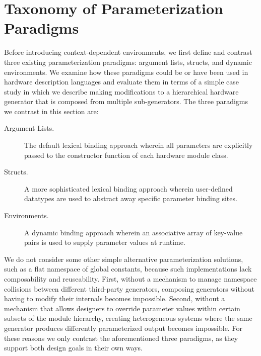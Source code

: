 \section{Taxonomy of Parameterization Paradigms}
\label{sec:tax}

Before introducing context-dependent environments, we first define and contrast three existing parameterization paradigms: argument lists, structs, and dynamic environments.
We examine how these paradigms could be or have been used in hardware description languages and evaluate them in terms of a simple case study
in which we describe making modifications to a hierarchical hardware generator that is composed from multiple sub-generators.
The three paradigms we contrast in this section are:

\begin{description}
\item[Argument Lists.] The default lexical binding approach wherein all parameters are explicitly passed to the constructor function of each hardware module class.
\item[Structs.] A more sophisticated lexical binding approach wherein user-defined datatypes are used to abstract away specific parameter binding sites.
\item[Environments.] A dynamic binding approach wherein an associative array of key-value pairs is used to supply parameter values at runtime.
\end{description}

We do not consider some other simple alternative parameterization solutions, such as a flat namespace of global constants, because such implementations lack composability and reuseability.
First, without a mechanism to manage namespace collisions between different third-party generators, composing generators without having to modify their internals becomes impossible.
Second, without a mechanism that allows designers to override parameter values within certain subsets of the module hierarchy, creating heterogeneous systems where the same generator
produces differently parameterized output becomes impossible.
For these reasons we only contrast the aforementioned three paradigms, as they support both design goals in their own ways.


